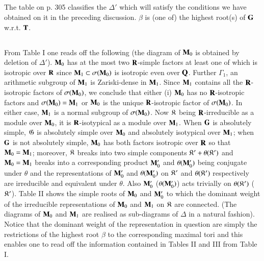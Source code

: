 \subsection{}\label{art9-subsec5.17}

The table on p. 305 classifies the $\Delta'$ which will satisfy the conditions we have obtained on it in the preceding discussion. $\beta$ is (one of) the highest root(s) of $\mathbf{G}$ w.r.t. $\mathbf{T}$.


\subsection{}\label{art9-subsec5.18}
From Table I one reads off the following (the diagram of $\mathbf{M}_0$ is obtained by deletion of $\Delta'$). $\mathbf{M}_0$ has at the most two $\mathbf{R}$-simple factors at least one of which is isotropic over $\mathbf{R}$ since $\mathbf{M}_1 \subset \sigma (\mathbf{M}_0)$ is isotropic even over $\mathbf{Q}$. Further $\Gamma_1$, an arithmetic subgroup of $\mathbf{M}_1$ is Zariski-dense in $\mathbf{M}_1$. Since $\mathbf{M}_1$ contains all the $\mathbf{R}$-isotropic factors of $\sigma(\mathbf{M}_0)$, we conclude that either (i) $\mathbf{M}_0$ has no $\mathbf{R}$-isotropic factors and $\sigma (\mathbf{M}_0) = \mathbf{M}_1$ or $\mathbf{M}_0$ is the unique $\mathbf{R}$-isotropic factor of $\sigma(\mathbf{M}_0)$. In either case, $\mathbf{M}_1$ is a normal subgroup of $\sigma(\mathbf{M}_0)$. Now $\mathfrak{K}$ being $\mathbf{R}$-irreducible as a module over $\mathbf{M}_0$, it is $\mathbf{R}$-isotypical as a module over $\mathbf{M}_1$. When $\mathbf{G}$ is absolutely simple, $\mathfrak{G}$ is absolutely simple over $\mathbf{M}_0$ and absolutely isotypical over $\mathbf{M}_1$; when $\mathbf{G}$ is not absolutely simple, $\mathbf{M}_0$ has both factors isotropic over $\mathbf{R}$ so that $\mathbf{M}_0 = \mathbf{M}_1$; moreover, $\mathfrak{K}$ breaks into two simple components $\mathfrak{K}'+ \theta (\mathfrak{K}')$ and $\mathbf{M}_0 = \mathbf{M}_1$ breaks into a corresponding product $\mathbf{M}'_0$ and $\theta(\mathbf{M}'_0)$ being conjugate under $\theta$ and the representations of $\mathbf{M}'_0$ and $\theta (\mathbf{M}'_0)$ on $\mathfrak{K}'$ and $\theta (\mathfrak{K}')$ respectively are irreducible and equivalent under $\theta$. Also $\mathbf{M}'_0$ (\resp $\theta(\mathbf{M}'_0)$) acts trivially on $\theta (\mathfrak{K}')$ (\resp $\mathfrak{K}'$). Table II shows the simple roots of $\mathbf{M}_0$ and $\mathbf{M}'_0$ to which the dominant weight of the irreducible representations of $\mathbf{M}_0$ and $\mathbf{M}_1$ on $\mathfrak{K}$ are connected. (The diagrams of $\mathbf{M}_0$ and $\mathbf{M}_1$ are realised as sub-diagrams of $\Delta$ in a natural fashion). Notice that the dominant weight of the representation in question are simply the restrictions of the highest root $\beta$ to the corresponding maximal tori and this enables one to read  off the information contained in Tables II and III from Table I.

